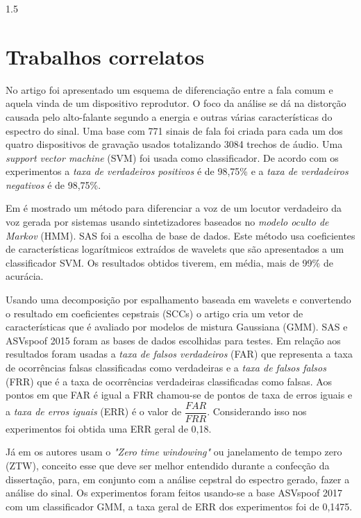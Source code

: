 \documentclass[a4paper,12pt,openright,oneside]{book}
\newenvironment{myenv}[1]
  {\begin{spacing}{#1}}
  {\end{spacing}}
\begin{document}
\begin{myenv}{1.5}
		\section{Trabalhos correlatos}
			\par No artigo \cite{Ren2019} foi apresentado um esquema de diferenciação entre a fala comum e aquela vinda de um dispositivo reprodutor. O foco da análise se dá na distorção causada pelo alto-falante segundo a energia e outras várias características do espectro do sinal. Uma base com 771 sinais de fala foi criada para cada um dos quatro dispositivos de gravação usados totalizando 3084 trechos de á\textsl{}udio. Uma \textit{support vector machine} (SVM) foi usada como classificador. De  acordo com os experimentos a \textit{taxa de verdadeiros positivos} é de 98,75\% e a \textit{taxa de verdadeiros negativos} é de 98,75\%.
			
			\par Em \cite{DiqunYan2019} é mostrado um método para diferenciar a voz de um locutor verdadeiro da voz gerada por sistemas usando sintetizadores baseados no \textit{modelo oculto de Markov} (HMM). SAS\cite{SAS2019} foi a escolha de base de dados. Este método usa coeficientes de características logarítmicos extraídos de wavelets que são apresentados a um classificador SVM. Os resultados obtidos tiverem, em média, mais de 99\% de acurácia.
			
			\par Usando uma decomposição por espalhamento baseada em wavelets e convertendo o resultado em coeficientes cepstrais (SCCs) o artigo \cite{7802552} cria um vetor de características que é avaliado por modelos de mistura Gaussiana (GMM). SAS e ASVspoof 2015 \cite{ASVspoof2015} foram as bases de dados escolhidas para testes. Em relação aos resultados foram usadas a \textit{taxa de falsos verdadeiros} (FAR) que representa a taxa de ocorrências falsas classificadas como verdadeiras e a \textit{taxa de falsos falsos} (FRR) que é a taxa de ocorrências verdadeiras classificadas como falsas. Aos pontos em que FAR é igual a FRR chamou-se de pontos de taxa de erros iguais e a \textit{taxa de erros iguais} (ERR) é o valor de $\dfrac{FAR}{FRR}$. Considerando isso nos experimentos foi obtida uma ERR geral de 0,18.

			\par Já em \cite{alluri2019replay} os autores usam o \textit{"Zero time windowing"} ou janelamento de tempo zero (ZTW), conceito esse que deve ser melhor entendido durante a confecção da dissertação, para, em conjunto com a análise cepstral do espectro gerado, fazer a análise do sinal. Os experimentos foram feitos usando-se a base ASVspoof 2017\cite{ASVspoof2017} com um classificador GMM, a taxa geral de ERR dos experimentos foi de 0,1475.
			

\end{myenv}
\end{document}
